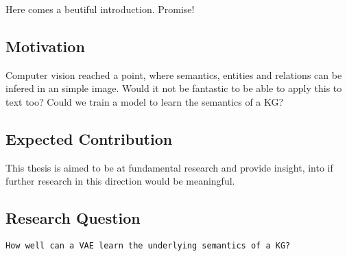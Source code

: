 Here comes a beutiful introduction. Promise!

\subsection{Motivation}

Computer vision reached a point, where semantics, entities and relations can be infered in an simple image.
Would it not be fantastic to be able to apply this to text too?
Could we train a model to learn the semantics of a KG?

\subsection{Expected Contribution}

This thesis is aimed to be at fundamental research and provide insight, into if further research in this direction would be meaningful.

\subsection{Research Question}

\texttt{How well can a VAE learn the underlying semantics of a KG?}
